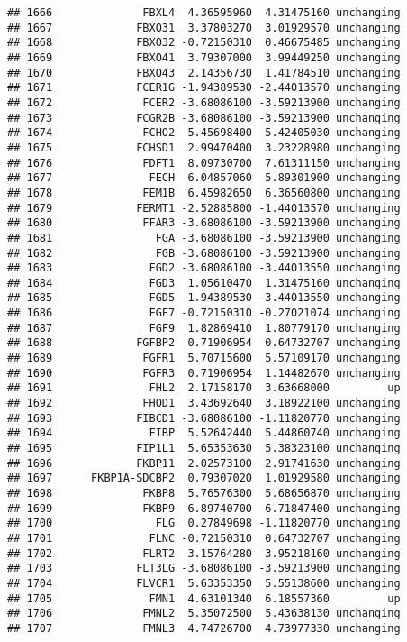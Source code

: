 \documentclass[]{article}
\begin{document}
\begin{verbatim}
## 1666              FBXL4  4.36595960  4.31475160 unchanging
## 1667             FBXO31  3.37803270  3.01929570 unchanging
## 1668             FBXO32 -0.72150310  0.46675485 unchanging
## 1669             FBXO41  3.79307000  3.99449250 unchanging
## 1670             FBXO43  2.14356730  1.41784510 unchanging
## 1671             FCER1G -1.94389530 -2.44013570 unchanging
## 1672              FCER2 -3.68086100 -3.59213900 unchanging
## 1673             FCGR2B -3.68086100 -3.59213900 unchanging
## 1674              FCHO2  5.45698400  5.42405030 unchanging
## 1675             FCHSD1  2.99470400  3.23228980 unchanging
## 1676              FDFT1  8.09730700  7.61311150 unchanging
## 1677               FECH  6.04857060  5.89301900 unchanging
## 1678              FEM1B  6.45982650  6.36560800 unchanging
## 1679             FERMT1 -2.52885800 -1.44013570 unchanging
## 1680              FFAR3 -3.68086100 -3.59213900 unchanging
## 1681                FGA -3.68086100 -3.59213900 unchanging
## 1682                FGB -3.68086100 -3.59213900 unchanging
## 1683               FGD2 -3.68086100 -3.44013550 unchanging
## 1684               FGD3  1.05610470  1.31475160 unchanging
## 1685               FGD5 -1.94389530 -3.44013550 unchanging
## 1686               FGF7 -0.72150310 -0.27021074 unchanging
## 1687               FGF9  1.82869410  1.80779170 unchanging
## 1688             FGFBP2  0.71906954  0.64732707 unchanging
## 1689              FGFR1  5.70715600  5.57109170 unchanging
## 1690              FGFR3  0.71906954  1.14482670 unchanging
## 1691               FHL2  2.17158170  3.63668000         up
## 1692              FHOD1  3.43692640  3.18922100 unchanging
## 1693             FIBCD1 -3.68086100 -1.11820770 unchanging
## 1694               FIBP  5.52642440  5.44860740 unchanging
## 1695             FIP1L1  5.65353630  5.38323100 unchanging
## 1696             FKBP11  2.02573100  2.91741630 unchanging
## 1697      FKBP1A-SDCBP2  0.79307020  1.01929580 unchanging
## 1698              FKBP8  5.76576300  5.68656870 unchanging
## 1699              FKBP9  6.89740700  6.71847400 unchanging
## 1700                FLG  0.27849698 -1.11820770 unchanging
## 1701               FLNC -0.72150310  0.64732707 unchanging
## 1702              FLRT2  3.15764280  3.95218160 unchanging
## 1703             FLT3LG -3.68086100 -3.59213900 unchanging
## 1704             FLVCR1  5.63353350  5.55138600 unchanging
## 1705               FMN1  4.63101340  6.18557360         up
## 1706              FMNL2  5.35072500  5.43638130 unchanging
## 1707              FMNL3  4.74726700  4.73977330 unchanging

\end{verbatim}
\end{document}
